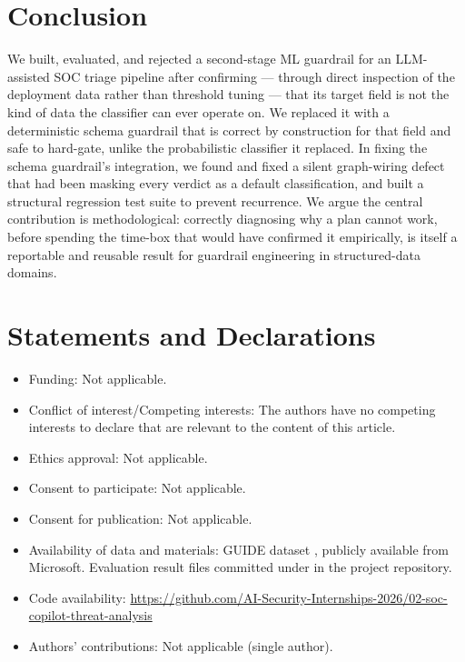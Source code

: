 \documentclass[twocolumn]{svjour3}
\begin{document}
\section{Conclusion}\label{sec6}

We built, evaluated, and rejected a second-stage ML guardrail for an LLM-assisted SOC triage pipeline after confirming --- through direct inspection of the deployment data rather than threshold tuning --- that its target field is not the kind of data the classifier can ever operate on. We replaced it with a deterministic schema guardrail that is correct by construction for that field and safe to hard-gate, unlike the probabilistic classifier it replaced. In fixing the schema guardrail's integration, we found and fixed a silent graph-wiring defect that had been masking every verdict as a default classification, and built a structural regression test suite to prevent recurrence. We argue the central contribution is methodological: correctly diagnosing why a plan cannot work, before spending the time-box that would have confirmed it empirically, is itself a reportable and reusable result for guardrail engineering in structured-data domains.

\section*{Statements and Declarations}

\begin{itemize}
\item Funding: Not applicable.
\item Conflict of interest/Competing interests: The authors have no competing interests to declare that are relevant to the content of this article.
\item Ethics approval: Not applicable.
\item Consent to participate: Not applicable.
\item Consent for publication: Not applicable.
\item Availability of data and materials: GUIDE dataset \cite{guide2024,guide_kaggle2024}, publicly available from Microsoft. Evaluation result files committed under  in the project repository.
\item Code availability: \url{https://github.com/AI-Security-Internships-2026/02-soc-copilot-threat-analysis}
\item Authors' contributions: Not applicable (single author).
\end{itemize}
\end{document}

